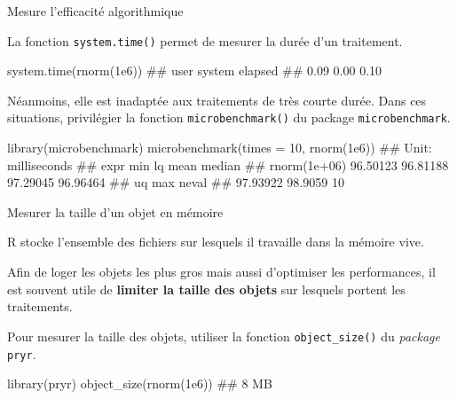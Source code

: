 \documentclass[12pt,ignorenonframetext,handout,]{beamer}
\newenvironment{Shaded}{}{}
\newcommand{\DataTypeTok}[1]{#1}
\newcommand{\DecValTok}[1]{#1}
\newcommand{\FloatTok}[1]{#1}
\newcommand{\KeywordTok}[1]{\textcolor[rgb]{0.00,0.00,1.00}{#1}}
\newcommand{\NormalTok}[1]{#1}
\renewenvironment{Shaded}{\begin{snugshade}}{\end{snugshade}}
\begin{document}
\begin{frame}[fragile]{Mesure l’efficacité algorithmique}
\protect\hypertarget{mesure-lefficacite-algorithmique}{}

La fonction \texttt{system.time()} permet de mesurer la durée d’un
traitement.

\footnotesize

\begin{Shaded}
\begin{Highlighting}[]
\KeywordTok{system.time}\NormalTok{(}\KeywordTok{rnorm}\NormalTok{(}\FloatTok{1e6}\NormalTok{))}
\NormalTok{  ##    user  system elapsed }
\NormalTok{  ##    0.09    0.00    0.10}
\end{Highlighting}
\end{Shaded}

\pause \normalsize

Néanmoins, elle est inadaptée aux traitements de très courte durée. Dans
ces situations, privilégier la fonction \texttt{microbenchmark()} du
package \texttt{microbenchmark}.

\footnotesize

\begin{Shaded}
\begin{Highlighting}[]
\KeywordTok{library}\NormalTok{(microbenchmark)}
\KeywordTok{microbenchmark}\NormalTok{(}\DataTypeTok{times =} \DecValTok{10}\NormalTok{, }\KeywordTok{rnorm}\NormalTok{(}\FloatTok{1e6}\NormalTok{))}
\NormalTok{  ## Unit: milliseconds}
\NormalTok{  ##          expr      min       lq     mean   median}
\NormalTok{  ##  rnorm(1e+06) 96.50123 96.81188 97.29045 96.96464}
\NormalTok{  ##        uq     max neval}
\NormalTok{  ##  97.93922 98.9059    10}
\end{Highlighting}
\end{Shaded}

\end{frame}

\begin{frame}[fragile]{Mesurer la taille d’un objet en mémoire}
\protect\hypertarget{mesurer-la-taille-dun-objet-en-memoire}{}

R stocke l’ensemble des fichiers sur lesquels il travaille dans la
mémoire vive.

Afin de loger les objets les plus gros mais aussi d’optimiser les
performances, il est souvent utile de \textbf{limiter la taille des
objets} sur lesquels portent les traitements.

\pause Pour mesurer la taille des objets, utiliser la fonction
\texttt{object\_size()} du \emph{package} \texttt{pryr}.

\begin{Shaded}
\begin{Highlighting}[]
\KeywordTok{library}\NormalTok{(pryr)}
\KeywordTok{object_size}\NormalTok{(}\KeywordTok{rnorm}\NormalTok{(}\FloatTok{1e6}\NormalTok{))}
\NormalTok{  ## 8 MB}
\end{Highlighting}
\end{Shaded}

\end{frame}
\end{document}

